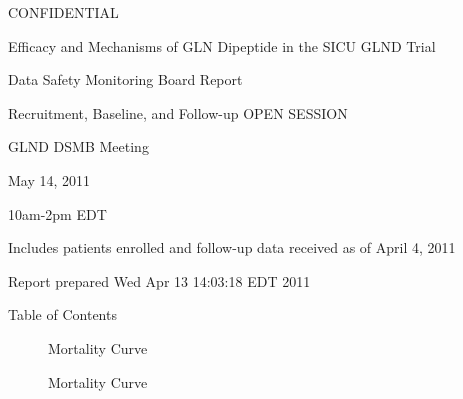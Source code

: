 \documentclass[dvips, 10pt]{article}
\begin{document}
\vspace*{1in}
\begin{center}
{\Huge{CONFIDENTIAL}}
\end{center}
\vspace*{0.5in}
\begin{center}
{\Huge{Efficacy and Mechanisms of GLN Dipeptide in the SICU GLND Trial}}
\end{center}
\vspace*{0.5in}
\begin{center}
{\Huge{Data Safety Monitoring Board Report}}
\end{center}
\vspace*{0.25in}
\begin{center}
{\Huge{
Recruitment, Baseline, and Follow-up  OPEN SESSION
}}
\end{center}
\vspace*{1in}
\begin{center}
{\Huge{GLND DSMB Meeting}}
\end{center}
\begin{center}
{\Huge{
May 14, 2011
}}
\end{center}
\begin{center}
{\Huge{10am-2pm EDT}}
\end{center}
\vspace*{1in}
\begin{center}
\noindent
{\Large{Includes patients enrolled and follow-up data received as of April 4, 2011}}
\end{center}
\vspace*{0.5in}
\begin{center}
{\Large{Report prepared  Wed Apr 13 14:03:18 EDT 2011 }}
\end{center}
\clearpage
\setcounter{page}{1}
\vspace*{1in}
\begin{center}
{\Huge{Table of Contents}}
\end{center}
\listoftables
\listoffigures
\clearpage

\begin{figure}
\caption{Mortality Curve }
\end{figure}

\begin{figure}
\caption{Mortality Curve }
\end{figure}
\end{document}
